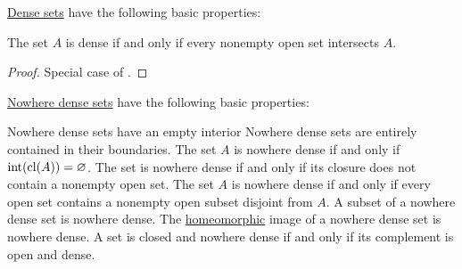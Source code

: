 \begin{proposition}\label{thm:dense_set_properties}
  \hyperref[def:topologically_dense_set/dense]{Dense sets} have the following basic properties:
  \begin{PropEnum}
     The set \( A \) is dense if and only if every nonempty open set intersects \( A \).
  \end{PropEnum}
\end{proposition}
\begin{proof}
   Special case of .
\end{proof}

\begin{proposition}\label{thm:nowhere_dense_properties}
  \hyperref[def:topologically_dense_set/nowhere_dense]{Nowhere dense sets} have the following basic properties:
  \begin{PropEnum}
     Nowhere dense sets have an empty interior
     Nowhere dense sets are entirely contained in their boundaries.
     The set \( A \) is nowhere dense if and only if \( \operatorname{int}(\operatorname{cl}(A)) = \varnothing \).
     The set is nowhere dense if and only if its closure does not contain a nonempty open set.
    The set \( A \) is nowhere dense if and only if every open set contains a nonempty open subset disjoint from \( A \).
     A subset of a nowhere dense set is nowhere dense.
     The \hyperref[def:homeomorphism]{homeomorphic} image of a nowhere dense set is nowhere dense.
     A set is closed and nowhere dense if and only if its complement is open and dense.
  \end{PropEnum}
\end{proposition}
